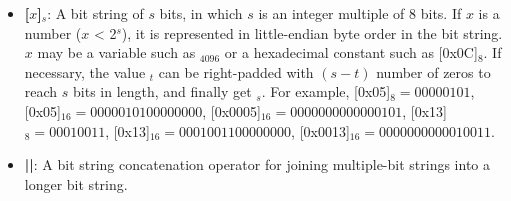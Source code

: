 \documentclass[main\_\_EN.tex]{subfiles}
\begin{document}
\begin{itemize}
    \item {\bfseries [\begin{math}x\end{math}]\begin{math}_{s}\end{math}}:
       A bit string of \begin{math}s\end{math} bits, in which \begin{math}s\end{math} is an integer multiple of 8 bits. If \begin{math}x\end{math} is a number (\begin{math}x\end{math} < 2\begin{math}^s\end{math}), it is represented in little-endian byte order in the bit string. \begin{math}x\end{math} may be a variable such as \begin{math}[Y]_{4096}\end{math} or a hexadecimal constant such as [0x0C]\begin{math}_{8}\end{math}. If necessary, the value \begin{math}[x]_{t}\end{math} can be right-padded with \begin{math} (s-t) \end{math} number of zeros to reach \begin{math}s\end{math} bits in length, and finally get \begin{math}[x]_{s}\end{math}. For example, [0x05]\begin{math}_{8} = 00000101\end{math},
       [0x05]\begin{math}_{16} = 00000101 00000000\end{math},
       [0x0005]\begin{math}_{16} = 00000000 00000101\end{math},
       [0x13]\begin{math}_{8} = 00010011\end{math},
       [0x13]\begin{math}_{16} = 00010011 00000000\end{math},
       [0x0013]\begin{math}_{16} = 00000000 00010011\end{math}.

    \item {\bfseries ||}:
       A bit string concatenation operator for joining multiple-bit strings into a longer bit string.
\end{itemize}
\end{document}
